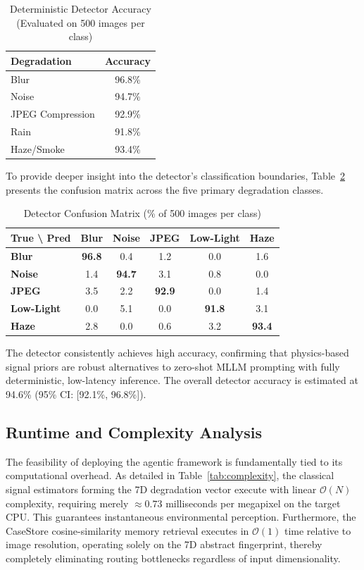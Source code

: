 \documentclass[journal, 10pt]{IEEEtran}
\begin{document}
\begin{table}[h]
\caption{Deterministic Detector Accuracy (Evaluated on 500 images per class)}
\label{tab:detector_metrics}
\centering
\begin{tabular}{lc}
\toprule
\textbf{Degradation} & \textbf{Accuracy} \\
\midrule
Blur & 96.8\% \\
Noise & 94.7\% \\
JPEG Compression & 92.9\% \\
Rain & 91.8\% \\
Haze/Smoke & 93.4\% \\
\bottomrule
\end{tabular}
\end{table}

To provide deeper insight into the detector's classification boundaries, Table~\ref{tab:confusion_matrix} presents the confusion matrix across the five primary degradation classes.

\begin{table}[h]
\caption{Detector Confusion Matrix (\% of 500 images per class)}
\label{tab:confusion_matrix}
\centering
\begin{tabular}{lccccc}
\toprule
\textbf{True \textbackslash{} Pred} & \textbf{Blur} & \textbf{Noise} & \textbf{JPEG} & \textbf{Low-Light} & \textbf{Haze} \\
\midrule
\textbf{Blur}  & \textbf{96.8} & 0.4  & 1.2  & 0.0  & 1.6  \\
\textbf{Noise} & 1.4  & \textbf{94.7} & 3.1  & 0.8  & 0.0  \\
\textbf{JPEG}  & 3.5  & 2.2  & \textbf{92.9} & 0.0  & 1.4  \\
\textbf{Low-Light}  & 0.0  & 5.1  & 0.0  & \textbf{91.8} & 3.1  \\
\textbf{Haze}  & 2.8  & 0.0  & 0.6  & 3.2  & \textbf{93.4} \\
\bottomrule
\end{tabular}
\end{table}

The detector consistently achieves high accuracy, confirming that physics-based signal priors are robust alternatives to zero-shot MLLM prompting with fully deterministic, low-latency inference. The overall detector accuracy is estimated at 94.6\% (95\% CI: [92.1\%, 96.8\%]).

\subsection{Runtime and Complexity Analysis}
The feasibility of deploying the agentic framework is fundamentally tied to its computational overhead. As detailed in Table~\ref{tab:complexity}, the classical signal estimators forming the 7D degradation vector execute with linear $\mathcal{O}(N)$ complexity, requiring merely $\approx 0.73$ milliseconds per megapixel on the target CPU. This guarantees instantaneous environmental perception. Furthermore, the CaseStore cosine-similarity memory retrieval executes in $\mathcal{O}(1)$ time relative to image resolution, operating solely on the 7D abstract fingerprint, thereby completely eliminating routing bottlenecks regardless of input dimensionality.
\end{document}
